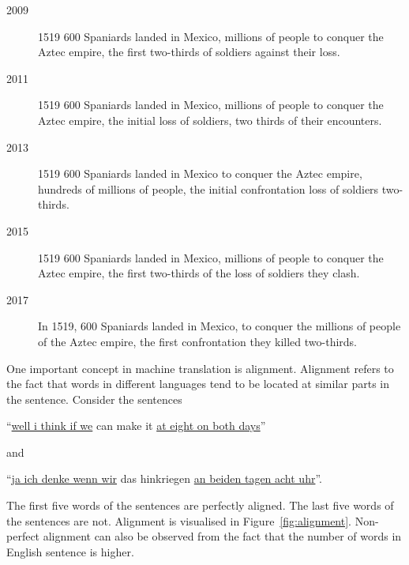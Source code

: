\begin{description}
    \item[2009] 1519 600 Spaniards landed in Mexico, millions of people to conquer the Aztec empire, the first two-thirds of soldiers against their loss.
    \item[2011] 1519 600 Spaniards landed in Mexico, millions of people to conquer the Aztec empire, the initial loss of soldiers, two thirds of their encounters.
    \item[2013] 1519 600 Spaniards landed in Mexico to conquer the Aztec empire, hundreds of millions of people, the initial confrontation loss of soldiers two-thirds.
    \item[2015] 1519 600 Spaniards landed in Mexico, millions of people to conquer the Aztec empire, the first two-thirds of the loss of soldiers they clash.
    \item[2017] In 1519, 600 Spaniards landed in Mexico, to conquer the millions of people of the Aztec empire, the first confrontation they killed two-thirds.
\end{description}

One important concept in machine translation is alignment.
Alignment refers to the fact that words in different languages tend to be located at similar parts in the sentence.
Consider the sentences

\begin{center}
    ``\underline{well i think if we} can make it \underline{at eight on both days}''
\end{center}
and
\begin{center}
    ``\underline{ja ich denke wenn wir} das hinkriegen \underline{an beiden tagen acht uhr}''.
\end{center}
\vspace*{1mm}
The first five words of the sentences are perfectly aligned.
The last five words of the sentences are not.
Alignment is visualised in Figure~\ref{fig:alignment}.
Non-perfect alignment can also be observed from the fact that the number of words in English sentence is higher.

